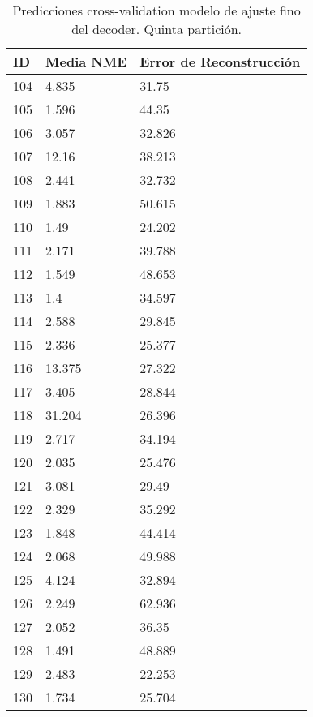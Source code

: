 \begin{table}[!ht]
    \centering
    \caption{Predicciones cross-validation modelo de ajuste fino del  decoder. Quinta partición.}
    \begin{tabular}{|l|l|l|}
    \hline
    \cellcolor{gray!25}\textbf{ID} & \cellcolor{gray!25}\textbf{Media NME} & \cellcolor{gray!25}\textbf{Error de Reconstrucción} \\ \hline
        104 & 4.835 & 31.75 \\ \hline
        105 & 1.596 & 44.35 \\ \hline
        106 & 3.057 & 32.826 \\ \hline
        107 & 12.16 & 38.213 \\ \hline
        108 & 2.441 & 32.732 \\ \hline
        109 & 1.883 & 50.615 \\ \hline
        110 & 1.49 & 24.202 \\ \hline
        111 & 2.171 & 39.788 \\ \hline
        112 & 1.549 & 48.653 \\ \hline
        113 & 1.4 & 34.597 \\ \hline
        114 & 2.588 & 29.845 \\ \hline
        115 & 2.336 & 25.377 \\ \hline
        116 & 13.375 & 27.322 \\ \hline
        117 & 3.405 & 28.844 \\ \hline
        118 & 31.204 & 26.396 \\ \hline
        119 & 2.717 & 34.194 \\ \hline
        120 & 2.035 & 25.476 \\ \hline
        121 & 3.081 & 29.49 \\ \hline
        122 & 2.329 & 35.292 \\ \hline
        123 & 1.848 & 44.414 \\ \hline
        124 & 2.068 & 49.988 \\ \hline
        125 & 4.124 & 32.894 \\ \hline
        126 & 2.249 & 62.936 \\ \hline
        127 & 2.052 & 36.35 \\ \hline
        128 & 1.491 & 48.889 \\ \hline
        129 & 2.483 & 22.253 \\ \hline
        130 & 1.734 & 25.704 \\ \hline
    \end{tabular}
\end{table}


\endinput

